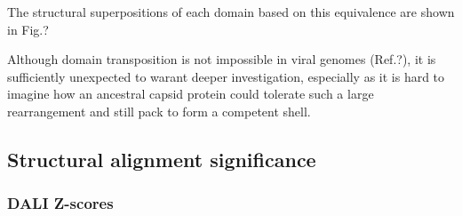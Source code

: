 % 
% 
The structural superpositions of each domain based on this equivalence are shown in Fig.?

Although domain transposition is not impossible in viral genomes (Ref.?),  it is sufficiently
unexpected to warant deeper investigation, especially as it is hard to imagine how an ancestral
capsid protein could tolerate such a large rearrangement and still pack to form a competent shell.

\subsection{Structural alignment significance}

\subsubsection{DALI Z-scores}

